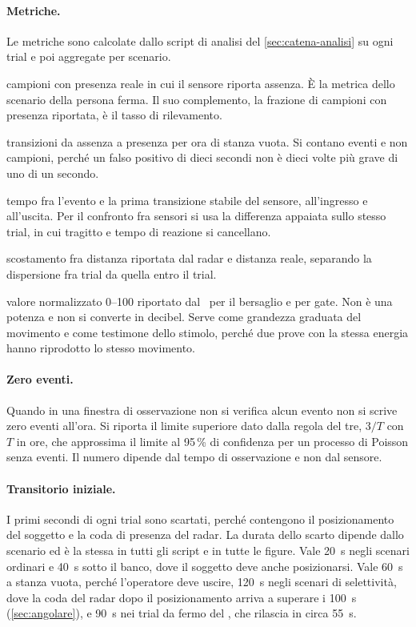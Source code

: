 \paragraph{Metriche.} Le metriche sono calcolate dallo script di analisi del
\cref{sec:catena-analisi} su ogni trial e poi aggregate per scenario.
\begin{description}[leftmargin=1.4em,style=nextline,itemsep=2pt]
  \item[Falsi negativi (\%)] campioni con presenza reale in cui il sensore riporta
    assenza. È la metrica dello scenario della persona ferma. Il suo complemento, la
    frazione di campioni con presenza riportata, è il tasso di rilevamento.
  \item[Falsi positivi (eventi/h)] transizioni da assenza a presenza per ora di
    stanza vuota. Si contano eventi e non campioni, perché un falso positivo di
    dieci secondi non è dieci volte più grave di uno di un secondo.
  \item[Latenza di rilevamento e di rilascio] tempo fra l'evento e la prima
    transizione stabile del sensore, all'ingresso e all'uscita. Per il confronto
    fra sensori si usa la differenza appaiata sullo stesso trial, in cui tragitto e
    tempo di reazione si cancellano.
  \item[Accuratezza della distanza] scostamento fra distanza riportata dal radar e
    distanza reale, separando la dispersione fra trial da quella entro il trial.
  \item[Energia] valore normalizzato 0--100 riportato dal \ldb\ per il bersaglio e
    per gate. Non è una potenza e non si converte in decibel. Serve come grandezza
    graduata del movimento e come testimone dello stimolo, perché due prove con la
    stessa energia hanno riprodotto lo stesso movimento.
\end{description}

\paragraph{Zero eventi.} Quando in una finestra di osservazione non si verifica
alcun evento non si scrive zero eventi all'ora. Si riporta il limite superiore dato
dalla regola del tre, $3/T$ con $T$ in ore, che approssima il limite al 95\,\% di
confidenza per un processo di Poisson senza eventi. Il numero dipende dal tempo di
osservazione e non dal sensore.

\paragraph{Transitorio iniziale.} I primi secondi di ogni trial sono scartati,
perché contengono il posizionamento del soggetto e la coda di presenza del radar.
La durata dello scarto dipende dallo scenario ed è la stessa in tutti gli script e
in tutte le figure. Vale 20~s negli scenari ordinari e 40~s sotto il banco, dove il
soggetto deve anche posizionarsi. Vale 60~s a stanza vuota, perché l'operatore deve
uscire, 120~s negli scenari di selettività, dove la coda del radar dopo il
posizionamento arriva a superare i 100~s (\cref{sec:angolare}), e 90~s nei trial da
fermo del \ldc, che rilascia in circa 55~s.

